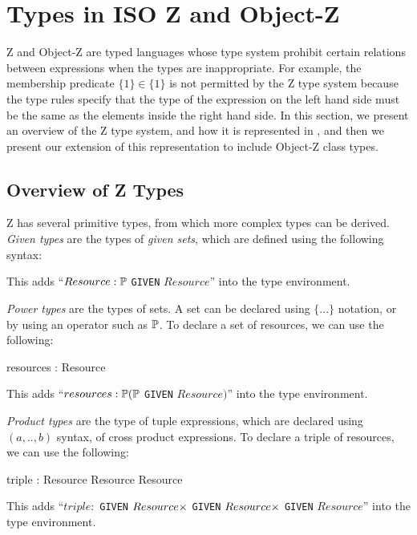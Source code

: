 \section{Types in ISO Z and Object-Z}

Z and Object-Z are typed languages whose type system prohibit certain
relations between expressions when the types are inappropriate. For
example, the membership predicate $\{1\} \in \{1\}$ is not permitted
by the Z type system because the type rules specify that the type of
the expression on the left hand side must be the same as the elements
inside the right hand side. In this section, we present an overview of
the Z type system, and how it is represented in \theStandard, and then
we present our extension of this representation to include Object-Z
class types.

\subsection{Overview of Z Types}

Z has several primitive types, from which more complex types can be
derived. {\em Given types} are the types of {\em given sets}, which are
defined using the following syntax:
\begin{zed}
  [Resource]
\end{zed}

This adds ``$Resource : \power$ {\tt GIVEN} $Resource$'' into the type
environment.

{\em Power types} are the types of sets. A set can be declared using
$\{...\}$ notation, or by using an operator such as $\power$. To
declare a set of resources, we can use the following:
\begin{axdef}
  resources : \power Resource
\end{axdef}

This adds ``$resources : \power (\power$ {\tt GIVEN}
$Resource)$'' into the type environment.

{\em Product types} are the type of tuple expressions, which are
declared using $(a, .., b)$ syntax, of cross product expressions. To
declare a triple of resources, we can use the following:
\begin{axdef}
   triple : Resource \cross Resource \cross Resource
\end{axdef}

This adds ``$triple : $ {\tt GIVEN}
$Resource \cross$ {\tt GIVEN} $Resource \cross$ {\tt GIVEN} $Resource$''
into the type environment.

